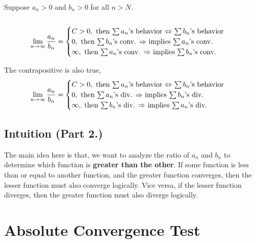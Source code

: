\documentclass{report}
\newtheorem{definition}{Definition}
\begin{document}
\begin{sloppypar}
\begin{center}
{{      Suppose $ a_{n} > 0 $ and $ b_{n} > 0 $ for all $ n > N $.
      \\
      \\


      \[ \lim_{n \rightarrow \infty} \frac{a_{n}}{b_{n}} =
        \begin{cases}
          C > 0, ~ \textrm{then $ \sum a_{n} $'s behavior $ \Leftrightarrow $
          $ \sum b_{n} $'s behavior } \\
          0, ~ \textrm{then $ \sum b_{n} $'s conv. $ \Rightarrow $ implies $ \sum a_{n}$'s conv.}  \\
          \infty, ~ \textrm{then $ \sum a_{n} $'s conv.
          $ \Rightarrow$ implies $ \sum b_{n} $'s conv. }
        \end{cases}\]

      The contrapositive is also true,
            \[
        \lim_{n \rightarrow \infty} \frac{a_{n}}{b_{n}} =
        \begin{cases}
          C > 0, ~ \textrm{then $ \sum a_{n} $'s behavior $ \Leftrightarrow $
          $ \sum b_{n} $'s behavior } \\
          0, ~ \textrm{then $ \sum a_{n} $'s div. $ \Rightarrow $ implies $ \sum b_{n}$'s div.}  \\
          \infty, ~ \textrm{then $ \sum b_{n} $'s div.
          $ \Rightarrow$ implies $ \sum a_{n} $'s div. }
        \end{cases}
      \]
    }}
\end{center}

      \subsection{Intuition (Part 2.)}
      The main idea here is that, we want to analyze the ratio
      of $ a_{n} $ and $ b_{n}$  to determine which function is
      \textbf{greater than the other}. If some function is less than or
      equal to another function, and the greater function converges,
      then the lesser function must also converge logically. Vice
      versa, if the lesser function diverges, then the greater
      function must also diverge logically.


\section{Absolute Convergence Test}
\begin{center}
\end{center}
\end{sloppypar}
\end{document}
